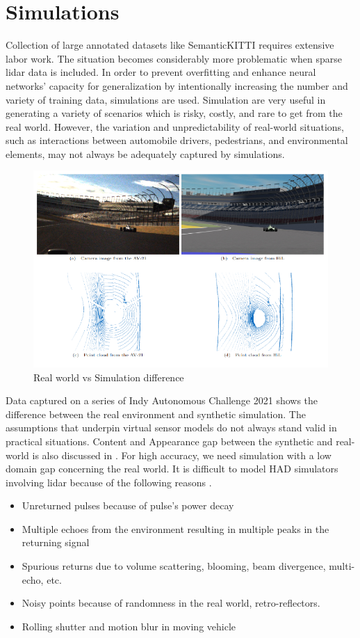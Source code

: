 \section{Simulations}
Collection of large annotated datasets like SemanticKITTI requires extensive labor work\parencite{behley2019semantickitti}. The situation becomes considerably more problematic when sparse lidar data is included. In order to prevent overfitting and enhance neural networks' capacity for generalization by intentionally increasing the number and variety of training data, simulations are used. Simulation are very useful in generating a variety of scenarios which is risky, costly, and rare to get from the real world. However, the variation and unpredictability of real-world situations, such as interactions between automobile drivers, pedestrians, and environmental elements, may not always be adequately captured by simulations.
\begin{figure}[htbp]
    \centering
    \includegraphics[width=0.8\linewidth]{97_graphics/related_work/real_vs_simulation_difference.pdf}
    \caption{Real world vs Simulation difference \parencite{sauerbeck_learn_Year}}
    \label{fig:related_work-real_vs_simulation}
\end{figure}

Data captured on a series of Indy Autonomous Challenge 2021 \parencite{sauerbeck_learn_Year} shows the difference between the real environment and synthetic simulation. The assumptions that underpin virtual sensor models do not always stand valid in practical situations. Content and Appearance gap between the synthetic and real-world is also discussed in \parencite{care_real_and_syn_gap}. For high accuracy, we need simulation with a low domain gap concerning the real world. It is difficult to model HAD simulators involving lidar because of the following reasons \parencite{zero_domain_gap}. 
\begin{itemize}
    \item Unreturned pulses because of pulse's power decay
    \item Multiple echoes from the environment resulting in multiple peaks in the returning signal
    \item Spurious returns due to volume scattering, blooming, beam divergence, multi-echo, etc.
    \item Noisy points because of randomness in the real world, retro-reflectors.
    \item Rolling shutter and motion blur in moving vehicle
\end{itemize}

